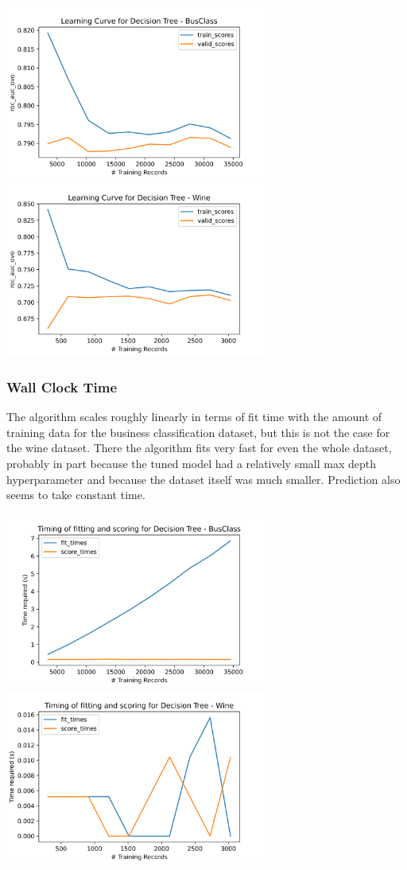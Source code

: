 \documentclass[
	letterpaper, %
]{jdf}
\begin{document}
\includegraphics[width=3.4in]{Figures/BusClass-0920/DT/learn_curve.png}
\includegraphics[width=3.4in]{Figures/Wine-0921/DT/learn_curve.png}

\subsubsection{Wall Clock Time}

The algorithm scales roughly linearly in terms of fit time with the amount of training data for the business classification dataset, but this is not the case for the wine dataset. There the algorithm fits very fast for even the whole dataset, probably in part because the tuned model had a relatively small max depth hyperparameter and because the dataset itself was much smaller. Prediction also seems to take constant time.

\includegraphics[width=3.4in]{Figures/BusClass-0920/DT/time_curve.png}
\includegraphics[width=3.4in]{Figures/Wine-0921/DT/time_curve.png}
\end{document}
